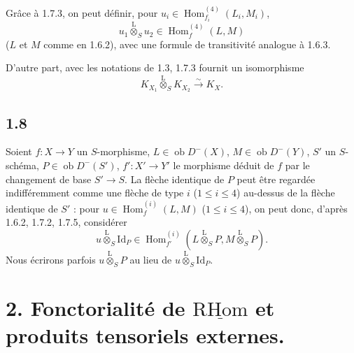 \documentclass[11pt]{article}
\DeclareMathOperator{\Hom}{Hom}
\newcommand{\R}{\mathrm{R}}\newcommand{\RHomCore}{\mathrm{RHom}}
\newcommand{\ob}{\operatorname{ob}}
\providecommand{\RHom}{\RHomCore}
\providecommand{\uRHom}{\underline{\RHom}}
\providecommand{\Id}{\mathrm{Id}}
\providecommand{\RHom}{\RHomCore}
\providecommand{\Hom}{\operatorname{Hom}}
\providecommand{\ob}{\operatorname{ob}}
\providecommand{\RHom}{\R\mathcal{H}om}
\providecommand{\R}{\mathrm R}
\providecommand{\RHom}{\RHomCore}
\providecommand{\Hom}{\operatorname{Hom}}
\begin{document}
Grâce à 1.7.3, on peut définir, pour $u_i\in\Hom_{f_i}^{(4)}(L_i,M_i)$,
\begin{equation}\tag{1.7.5}
u_1\overset{\mathrm{L}}{\otimes}_{S}u_2\in\Hom_f^{(4)}(L,M)
\end{equation}
($L$ et $M$ comme en 1.6.2), avec une formule de transitivité analogue à 1.6.3.

D'autre part, avec les notations de 1.3, 1.7.3 fournit un isomorphisme
\begin{equation}\tag{1.7.6}
K_{X_1}\overset{\mathrm{L}}{\otimes}_{S}K_{X_2}\xrightarrow{\sim}K_X.
\end{equation}

\subsection*{1.8}
Soient $f:X\to Y$ un $S$-morphisme, $L\in\ob D^{-}(X)$, $M\in\ob D^{-}(Y)$, $S'$ un $S$-schéma, $P\in\ob D^{-}(S')$, $f':X'\to Y'$ le morphisme déduit de $f$ par le changement de base $S'\to S$. La flèche identique de $P$ peut être regardée indifféremment comme une flèche de type $i$ ($1\leq i\leq4$) au-dessus de la flèche identique de $S'$ : pour $u\in\Hom_f^{(i)}(L,M)$ ($1\leq i\leq4$), on peut donc, d'après 1.6.2, 1.7.2, 1.7.5, considérer
\begin{equation}\tag{1.8.1}
u\overset{\mathrm{L}}{\otimes}_{S}\Id_P\in\Hom_{f'}^{(i)}(L\overset{\mathrm{L}}{\otimes}_{S}P,M\overset{\mathrm{L}}{\otimes}_{S}P).
\end{equation}
Nous écrirons parfois $u\overset{\mathrm{L}}{\otimes}_{S}P$ au lieu de $u\overset{\mathrm{L}}{\otimes}_{S}\Id_P$.

\section*{2. Fonctorialité de \texorpdfstring{$\uRHom$}{RHom} et produits tensoriels externes.}
\end{document}
